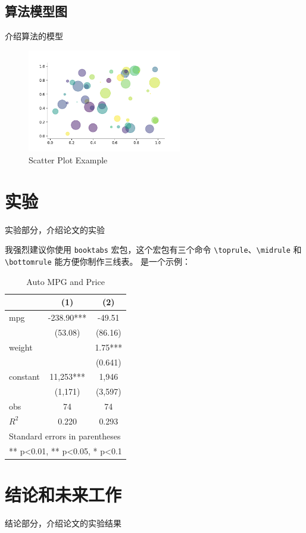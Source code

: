 \documentclass[lang=cn,11pt]{elegantpaper}
\begin{document}
\subsection{算法模型图}

介绍算法的模型

\begin{figure}[h]
	\centering
	\includegraphics[width=0.6\textwidth]{imgs/scatter.pdf}
	\caption{Scatter Plot Example \label{fig:scatter}}
\end{figure}


\section{实验}
实验部分，介绍论文的实验

我强烈建议你使用 \lstinline{booktabs} 宏包，这个宏包有三个命令 \lstinline{\toprule}、\lstinline{\midrule} 和 \lstinline{\bottomrule} 能方便你制作三线表。 是一个示例：

\begin{table}[h]
	\centering
	\caption{Auto MPG and Price \label{tab:reg}}
	\begin{tabular}{lcc}
		\toprule
		&       (1)         &        (2)      \\
		\midrule
		mpg             &    -238.90***     &      -49.51     \\
		&     (53.08)       &      (86.16)    \\
		weight          &                   &      1.75***    \\
		&                   &      (0.641)    \\
		constant        &     11,253***     &       1,946     \\
		&     (1,171)       &      (3,597)   \\
		obs             &        74         &         74     \\
		$R^2$           &      0.220        &       0.293    \\
		\bottomrule
		\multicolumn{3}{l}{\scriptsize Standard errors in parentheses} \\
		\multicolumn{3}{l}{\scriptsize *** p<0.01, ** p<0.05, * p<0.1} \\
	\end{tabular}%
\end{table}%

\section{结论和未来工作}
结论部分，介绍论文的实验结果




\end{document}
